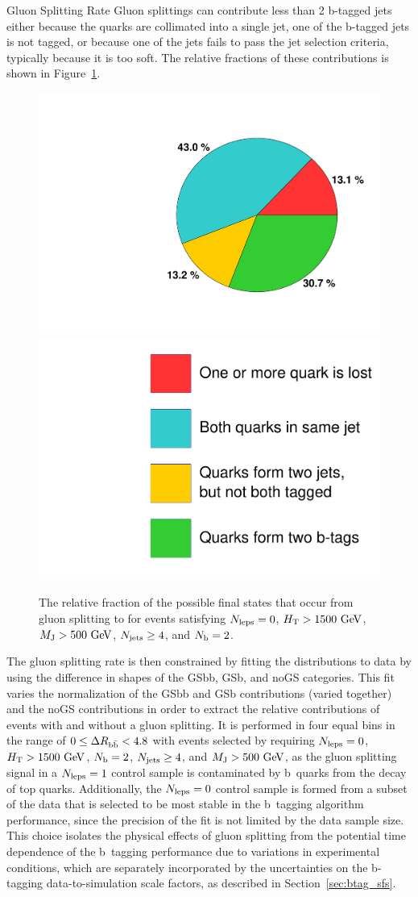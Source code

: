 \begin{section}{Gluon Splitting Rate}
Gluon splittings can contribute less than 2 b-tagged jets either because the quarks are collimated into a single jet, one of the b-tagged jets is not tagged, or because one of the jets fails to pass the jet selection criteria, typically because it is too soft.
The relative fractions of these contributions is shown in Figure~\ref{fig:gs_categories}.

\begin{figure}[tbp!]
\begin{center}
\includegraphics[angle=0,width=0.45\columnwidth]{fig/gs_piechart.pdf}
\includegraphics[angle=0,width=0.45\columnwidth]{fig/gs_piechart_legend.pdf}
\end{center}
\caption{The relative fraction of the possible final states that occur from gluon splitting to \bbbar for events satisfying $N_{\mathrm{leps}} = 0$, $H_{\mathrm{T}} > 1500~\mathrm{Ge\kern -0.1em V}$, $M_{\mathrm{J}} > 500~\mathrm{Ge\kern -0.1em V}$, $N_{\mathrm{jets}} \geq 4$, and $N_{\mathrm{b}} = 2$.}
\label{fig:gs_categories}
\end{figure}

The gluon splitting rate is then constrained by fitting the \dRbb distributions to data by using the difference in shapes of the GSbb, GSb, and noGS categories.
This fit varies the normalization of the GSbb and GSb contributions (varied together) and the noGS contributions in order to extract the relative contributions of events with and without a gluon splitting.
It is performed in four equal bins in the range of $0 \leq \Delta R_{\mathrm{b\bar{b}}} < 4.8$ with events selected by requiring $N_{\mathrm{leps}} = 0$, $H_{\mathrm{T}} > 1500~\mathrm{Ge\kern -0.1em V}$, $N_{\mathrm{b}} = 2$, $N_{\mathrm{jets}} \geq 4$, and $M_{\mathrm{J}} > 500~\mathrm{Ge\kern -0.1em V}$, as the gluon splitting signal in a $N_{\mathrm{leps}} = 1$ control sample is contaminated by b~quarks from the decay of top quarks.
Additionally, the $N_{\mathrm{leps}} = 0$ control sample is formed from a subset of the data that is selected to be most stable in the b~tagging algorithm performance, since the precision of the \dRbb fit is not limited by the data sample size.
This choice isolates the physical effects of gluon splitting from the potential time dependence of the b~tagging performance due to variations in experimental conditions, which are separately incorporated by the uncertainties on the b-tagging data-to-simulation scale factors, as described in Section~\ref{sec:btag_sfs}.


\end{section}
